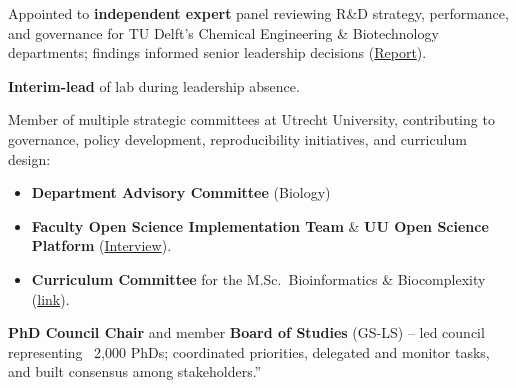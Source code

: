 \documentclass[a4paper,10pt]{article}
\begin{document}
{\begin{adjustbox}{valign=t}
\begin{minipage}[t]{0.6\textwidth}
\begin{description}
\raggedright
\item[\normalfont \textcolor{ForestGreen}{\textbf{2021 -- 2022.}}] Appointed to \textbf{independent expert} panel reviewing R\&D strategy, performance, and governance 
  for TU Delft’s Chemical Engineering \& Biotechnology departments; findings informed senior leadership decisions 
  (\href{https://filelist.tudelft.nl/TUDelft/Onderzoek/Kwaliteitsborging/Final report SEP Chemistry TU Delft 20220204.pdf}{Report}).
\item[\normalfont \textcolor{ForestGreen}{\textbf{2019.}}] \textbf{Interim-lead} of lab during leadership absence.
\item[\normalfont \textcolor{ForestGreen}{\textbf{2019 -- now.}}] Member of multiple strategic committees at Utrecht University, 
contributing to governance, policy development, reproducibility initiatives, and curriculum design:
  \begin{itemize}
    \item \textbf{Department Advisory Committee} (Biology) %
    \item \textbf{Faculty Open Science Implementation Team} \& \textbf{UU Open Science Platform} %
      (\href{https://www.uu.nl/en/news/meet-laura-dijkhuizen}{Interview}).
    \item \textbf{Curriculum Committee} for the M.Sc.\ Bioinformatics \& Biocomplexity %
    (\href{https://www.uu.nl/en/masters/bioinformatics-and-biocomplexity}{link}).
  \end{itemize}
  \item[\normalfont \textcolor{ForestGreen}{\textbf{2017 -- 2021.}}] \textbf{PhD Council Chair} 
    and member \textbf{Board of Studies} (GS-LS) 
      -- led council representing ~2,000 PhDs; coordinated priorities, delegated and monitor tasks, 
      and built consensus among stakeholders.”
\end{description}



\end{minipage}
\end{adjustbox}}
\end{document}
